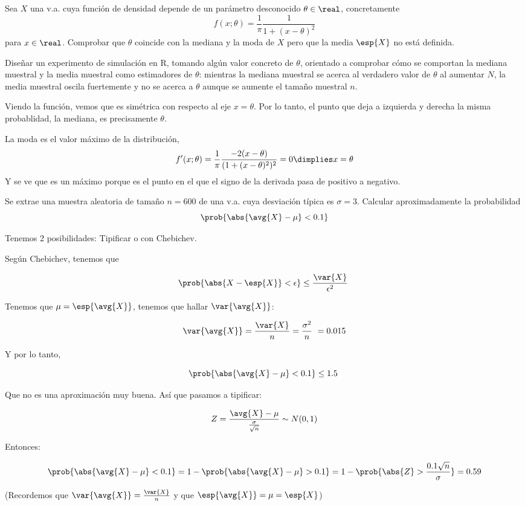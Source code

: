 \newpage
\begin{problem}[5] Sea $X$ una v.a. cuya función de densidad depende de un parámetro desconocido $\theta \in \real$, concretamente
\[ f(x;\theta) = \frac{1}{\pi}\frac{1}{1+(x-\theta)^2} \]
para $x\in \real$. Comprobar que $\theta$ coincide con la mediana y la moda de $X$ pero que la media $\esp{X}$ no está definida.

Diseñar un experimento de simulación en R, tomando algún valor concreto de $\theta$, orientado a comprobar cómo se comportan la mediana muestral y la media muestral como estimadores de $\theta$: mientras la mediana muestral se acerca al verdadero valor de $\theta$ al aumentar $N$, la media muestral oscila fuertemente y no se acerca a $\theta$ aunque se aumente el tamaño muestral $n$.

\solution Viendo la función, vemos que es simétrica con respecto al eje $x= \theta$. Por lo tanto, el punto que deja a izquierda y derecha la misma probablidad, la mediana, es precisamente $\theta$. 

La moda es el valor máximo de la distribución,
\[ f'(x;\theta) = \frac{1}{\pi} \frac{-2(x-\theta)}{(1+(x-\theta)^2)^2} = 0 \dimplies x = \theta \]
Y se ve que es un máximo porque es el punto en el que el signo de la derivada pasa de positivo a negativo.
\end{problem}

\begin{problem}[6]
Se extrae una muestra aleatoria de tamaño $n = 600$ de una v.a. cuya desviación típica es $\sigma = 3$.
Calcular aproximadamente la probabilidad
\[\prob{\abs{\avg{X} - \mu} < 0.1}\]

\solution
Tenemos 2 posibilidades: Tipificar o con Chebichev.

Según Chebichev, tenemos que 

\[ \prob{\abs{X - \esp{X}} < \epsilon} \leq \frac{\var{X}}{\epsilon^2} \]

Tenemos que $\mu = \esp{\avg{X}}$, tenemos que hallar $\var{\avg{X}}$:

\[ \var{\avg{X}} = \frac{\var{X}}{n} = \frac{\sigma^2}{n} = 0.015 \]

Y por lo tanto,

\[ \prob{\abs{\avg{X} - \mu} < 0.1} \leq 1.5 \]

Que no es una aproximación muy buena. Así que pasamos a tipificar:

\[ Z = \frac{\avg{X} - \mu}{\frac{\sigma}{\sqrt{n}}} \sim N(0,1) \]

Entonces:

\[
\prob{\abs{\avg{X} - \mu} < 0.1} =
1 - \prob{\abs{\avg{X} - \mu} > 0.1} =
1 - \prob{\abs{Z} > \frac{0.1\sqrt{n}}{\sigma}} =
0.59
\] 

(Recordemos que $\var{\avg{X}} = \frac{\var{X}}{n}$ y que $\esp{\avg{X}} = \mu = \esp{X}$)

\end{problem}

